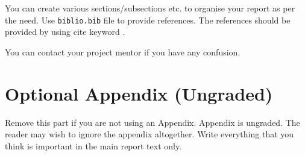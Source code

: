 \documentclass{article}
\begin{document}
You can create various sections/subsections etc. to organise your report as per the need. Use \texttt{biblio.bib} file to provide references. The references should be provided by using cite keyword \cite{langley00}.

You can contact your project mentor if you have any confusion.


\newpage






\appendix
\section{Optional Appendix (Ungraded)}
Remove this part if you are not using an Appendix. Appendix is ungraded. The
reader may wish to ignore the appendix altogether. Write everything that you
think is important in the main report text only.

\end{document}
